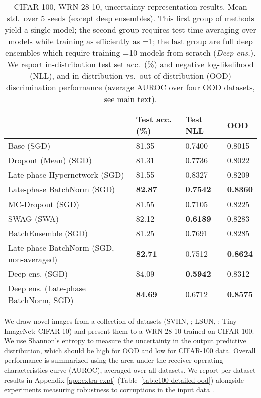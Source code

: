 \documentclass{article} \usepackage{iclr2021_conference,times}
\begin{document}
\setlength\intextsep{10pt}
\begin{table}[h]
\vspace{0.2cm}
\centering
\caption{CIFAR-100, WRN-28-10, uncertainty representation results. Mean  std.~over 5 seeds (except deep ensembles). This first group of methods yield a single model; the second group requires test-time averaging over models while training as efficiently as =1; the last group are full deep ensembles which require training =10 models from scratch (\emph{Deep ens.}). We report in-distribution test set acc.~(\%) and negative log-likelihood (NLL), and in-distribution vs.~out-of-distribution (OOD) discrimination performance (average AUROC over four OOD datasets, see main text).\label{tab:ood}}
\begin{tabular}{llll}

\toprule
               & Test acc. (\%) & Test NLL & OOD \\\midrule
Base (SGD)            &   81.35 & 0.7400 &   0.8015         \\\midrule
Dropout (Mean) (SGD)     &    81.31       &0.7736&      0.8022    \\
Late-phase Hypernetwork (SGD)     &  81.55   & 0.8327  &   0.8209    \\
Late-phase BatchNorm (SGD)     &    \textbf{82.87}       &\textbf{0.7542}&      \textbf{0.8360}    \\
\midrule
MC-Dropout (SGD)     &    81.55       &0.7105&      0.8225    \\
SWAG (SWA)         & 82.12    &    \textbf{0.6189}     &      0.8283    \\
BatchEnsemble (SGD)     &    81.25       &0.7691&      0.8285    \\
Late-phase BatchNorm (SGD, non-averaged)     &    \textbf{82.71}       & 0.7512&      \textbf{0.8624}  \\
\midrule
Deep ens. (SGD) & 84.09 & \textbf{0.5942} &  0.8312 \\
Deep ens. (Late-phase BatchNorm, SGD) & \textbf{84.69} & 0.6712 &  \textbf{0.8575} \\\bottomrule       
\end{tabular}
\end{table}
We draw novel images from a collection of datasets (SVHN, \citet{netzer_reading_2011}; LSUN, \citet{yu_lsun_2015}; Tiny ImageNet; CIFAR-10) and present them to a WRN 28-10 trained on CIFAR-100.  We use Shannon's entropy \citep{cover_elements_2006} to measure the uncertainty in the output predictive distribution, which should be high for OOD and low for CIFAR-100 data. Overall performance is summarized using the area under the receiver operating characteristics curve (AUROC), averaged over all datasets. We report per-dataset results in Appendix \ref{apx:extra-expt} (Table~\ref{tab:c100-detailed-ood}) alongside experiments measuring robustness to corruptions in the input data \citep{hendrycks_benchmarking_2019}.
\end{document}
